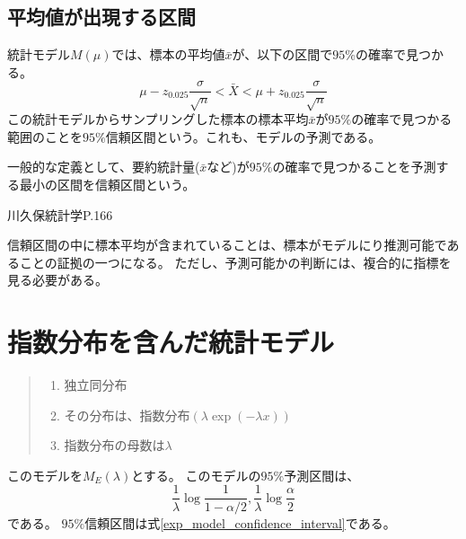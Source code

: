     

\subsection{平均値が出現する区間}
統計モデル$M(\mu)$では、標本の平均値$\bar{x}$が、以下の区間で$95\%$の確率で見つかる。
\begin{equation*}
    \mu - z_{0.025} \frac{\sigma}{\sqrt{n}} < \bar{X} < \mu + z_{0.025} \frac{\sigma}{\sqrt{n}}
\end{equation*}
この統計モデルからサンプリングした標本の標本平均$\bar{x}$が$95\%$の確率で見つかる範囲のことを$95\%$信頼区間という。これも、モデルの予測である。

一般的な定義として、要約統計量($\bar{x}$など)が$95\%$の確率で見つかることを予測する最小の区間を信頼区間という。



 川久保統計学P.166
 \fi



信頼区間の中に標本平均が含まれていることは、標本がモデルにり推測可能であることの証拠の一つになる。
ただし、予測可能かの判断には、複合的に指標を見る必要がある。






\section{指数分布を含んだ統計モデル}
\begin{quote}
    \begin{enumerate}[(1)]
    \item 独立同分布
    \item その分布は、指数分布$(\lambda\exp{(-\lambda x)})$
    \item 指数分布の母数は$\lambda$
    \end{enumerate}
\end{quote}
このモデルを$M_E(\lambda)$とする。
このモデルの$95\%$予測区間は、
\begin{equation*}
    \frac{1}{\lambda} \log\frac{1}{1-\alpha/2} ,\frac{1}{\lambda}\log\frac{\alpha}{2}    
\end{equation*}
である。
$95\%$信頼区間は式\ref{exp_model_confidence_interval}である。



